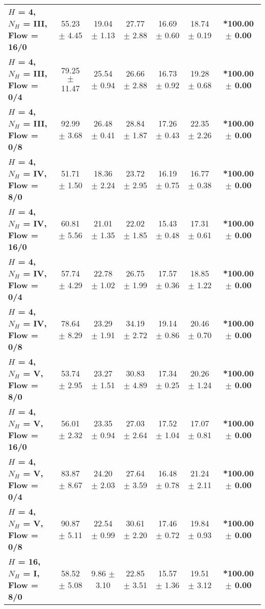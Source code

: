 \begin{table*}[ht]
{\begin{tabular}{lcccccc}
        \textbf{$H$ = 4, $N_H$ = III, Flow = 16/0} & 55.23 $\pm$ 4.45 & 19.04 $\pm$ 1.13 & 27.77 $\pm$ 2.88 & 16.69 $\pm$ 0.60 & 18.74 $\pm$ 0.19 & \textbf{*100.00 $\pm$ 0.00} \\
        \textbf{$H$ = 4, $N_H$ = III, Flow = 0/4} & 79.25 $\pm$ 11.47 & 25.54 $\pm$ 0.94 & 26.66 $\pm$ 2.88 & 16.73 $\pm$ 0.92 & 19.28 $\pm$ 0.68 & \textbf{*100.00 $\pm$ 0.00} \\
        \textbf{$H$ = 4, $N_H$ = III, Flow = 0/8} & 92.99 $\pm$ 3.68 & 26.48 $\pm$ 0.41 & 28.84 $\pm$ 1.87 & 17.26 $\pm$ 0.43 & 22.35 $\pm$ 2.26 & \textbf{*100.00 $\pm$ 0.00} \\
        \midrule
        \textbf{$H$ = 4, $N_H$ = IV, Flow = 8/0} & 51.71 $\pm$ 1.50 & 18.36 $\pm$ 2.24 & 23.72 $\pm$ 2.95 & 16.19 $\pm$ 0.75 & 16.77 $\pm$ 0.38 & \textbf{*100.00 $\pm$ 0.00} \\
        \textbf{$H$ = 4, $N_H$ = IV, Flow = 16/0} & 60.81 $\pm$ 5.56 & 21.01 $\pm$ 1.35 & 22.02 $\pm$ 1.85 & 15.43 $\pm$ 0.48 & 17.31 $\pm$ 0.61 & \textbf{*100.00 $\pm$ 0.00} \\
        \textbf{$H$ = 4, $N_H$ = IV, Flow = 0/4} & 57.74 $\pm$ 4.29 & 22.78 $\pm$ 1.02 & 26.75 $\pm$ 1.99 & 17.57 $\pm$ 0.36 & 18.85 $\pm$ 1.22 & \textbf{*100.00 $\pm$ 0.00} \\
        \textbf{$H$ = 4, $N_H$ = IV, Flow = 0/8} & 78.64 $\pm$ 8.29 & 23.29 $\pm$ 1.91 & 34.19 $\pm$ 2.72 & 19.14 $\pm$ 0.86 & 20.46 $\pm$ 0.70 & \textbf{*100.00 $\pm$ 0.00} \\
        \midrule
        \textbf{$H$ = 4, $N_H$ = V, Flow = 8/0} & 53.74 $\pm$ 2.95 & 23.27 $\pm$ 1.51 & 30.83 $\pm$ 4.89 & 17.34 $\pm$ 0.25 & 20.26 $\pm$ 1.24 & \textbf{*100.00 $\pm$ 0.00} \\
        \textbf{$H$ = 4, $N_H$ = V, Flow = 16/0} & 56.01 $\pm$ 2.32 & 23.35 $\pm$ 0.94 & 27.03 $\pm$ 2.64 & 17.52 $\pm$ 1.04 & 17.07 $\pm$ 0.81 & \textbf{*100.00 $\pm$ 0.00} \\
        \textbf{$H$ = 4, $N_H$ = V, Flow = 0/4} & 83.87 $\pm$ 8.67 & 24.20 $\pm$ 2.03 & 27.64 $\pm$ 3.59 & 16.48 $\pm$ 0.78 & 21.24 $\pm$ 2.11 & \textbf{*100.00 $\pm$ 0.00} \\
        \textbf{$H$ = 4, $N_H$ = V, Flow = 0/8} & 90.87 $\pm$ 5.11 & 22.54 $\pm$ 0.99 & 30.61 $\pm$ 2.20 & 17.46 $\pm$ 0.72 & 19.84 $\pm$ 0.93 & \textbf{*100.00 $\pm$ 0.00} \\
        \midrule
        \midrule
        \textbf{$H$ = 16, $N_H$ = I, Flow = 8/0} & 58.52 $\pm$ 5.08 & 9.86 $\pm$ 3.10 & 22.85 $\pm$ 3.51 & 15.57 $\pm$ 1.36 & 19.51 $\pm$ 3.12 & \textbf{*100.00 $\pm$ 0.00} \\

\end{tabular}}
\end{table*}
